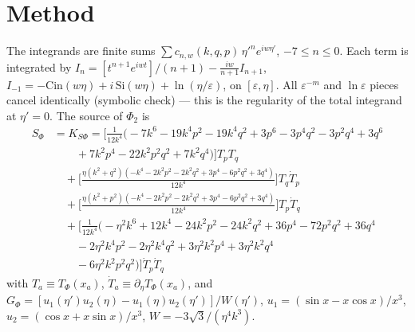 \documentclass[10pt]{article}
\begin{document}
\section{Method}
The integrands are finite sums $\sum c_{n,w}(k,q,p)\,\eta'^n e^{iw\eta'}$, $-7\le n\le0$. Each term is integrated by
$I_n=[t^{n+1}e^{iwt}]/(n+1)-\frac{iw}{n+1}I_{n+1}$, $I_{-1}=-\mathrm{Cin}(w\eta)+i\,\mathrm{Si}(w\eta)+\ln(\eta/\varepsilon)$, on $[\varepsilon,\eta]$.
All $\varepsilon^{-m}$ and $\ln\varepsilon$ pieces cancel identically (symbolic check) --- this is the regularity of the total
integrand at $\eta'=0$. The source of $\Phi_2$ is
\begin{align}
S_\Phi&=K_{S\Phi}= \Big[\frac{1}{12 k^{4}}\Big(- 7 k^{6} - 19 k^{4} p^{2} - 19 k^{4} q^{2} + 3 p^{6} - 3 p^{4} q^{2} - 3 p^{2} q^{4} + 3 q^{6} \\ &\qquad +7 k^{2} p^{4} - 22 k^{2} p^{2} q^{2} + 7 k^{2} q^{4}\Big)\Big] T_{p} T_{q} \\ &\quad + \Big[\frac{\eta \left(k^{2} + q^{2}\right) \left(- k^{4} - 2 k^{2} p^{2} - 2 k^{2} q^{2} + 3 p^{4} - 6 p^{2} q^{2} + 3 q^{4}\right)}{12 k^{4}}\Big] T_{q} \dot{T}_p \\ &\quad + \Big[\frac{\eta \left(k^{2} + p^{2}\right) \left(- k^{4} - 2 k^{2} p^{2} - 2 k^{2} q^{2} + 3 p^{4} - 6 p^{2} q^{2} + 3 q^{4}\right)}{12 k^{4}}\Big] T_{p} \dot{T}_q \\ &\quad + \Big[\frac{1}{12 k^{4}}\Big(- \eta^{2} k^{6} + 12 k^{4} - 24 k^{2} p^{2} - 24 k^{2} q^{2} + 36 p^{4} - 72 p^{2} q^{2} + 36 q^{4} \\ &\qquad - 2 \eta^{2} k^{4} p^{2} - 2 \eta^{2} k^{4} q^{2} + 3 \eta^{2} k^{2} p^{4} + 3 \eta^{2} k^{2} q^{4} \\ &\qquad - 6 \eta^{2} k^{2} p^{2} q^{2}\Big)\Big] \dot{T}_p \dot{T}_q
\end{align}
with $T_a\equiv T_\Phi(x_a)$, $\dot T_a\equiv\partial_\eta T_\Phi(x_a)$, and $G_\Phi=[u_1(\eta')u_2(\eta)-u_1(\eta)u_2(\eta')]/W(\eta')$,
$u_1=(\sin x-x\cos x)/x^3$, $u_2=(\cos x+x\sin x)/x^3$, $W=-3\sqrt3/(\eta^4k^3)$.
\end{document}

